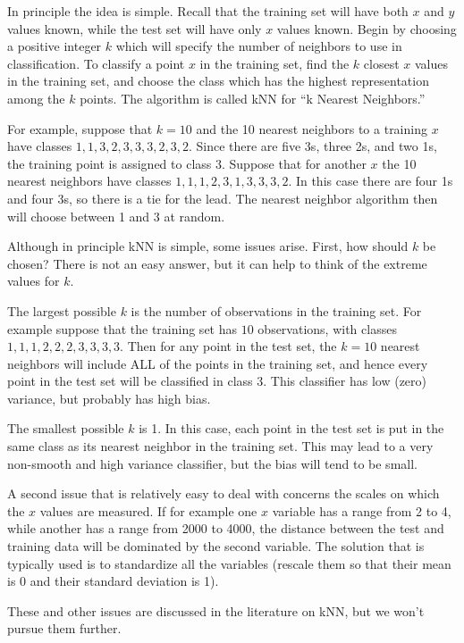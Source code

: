 \documentclass[12pt,oneside]{book}\usepackage[]{graphicx}\usepackage[]{color}
\begin{document}
{In principle the idea is simple. Recall that the training set will have both $x$ and $y$ values known, while the test set will have only $x$ values known. Begin by choosing a positive integer $k$ which will specify the number of neighbors to use in classification. To classify a point $x$ in the training set, find the $k$ closest $x$ values in the training set, and choose the class which has the highest representation among the $k$ points. The algorithm is called kNN for ``k Nearest Neighbors.'' 

For example, suppose that $k=10$ and the 10 nearest neighbors to a training $x$ have classes $1, 1, 3, 2, 3, 3, 3, 2, 3, 2$. Since there are five 3s, three 2s, and two 1s, the training point is assigned to class 3. Suppose that for another $x$ the 10 nearest neighbors have classes $1,1,1,2,3,1,3,3,3,2$. In this case there are four 1s and four 3s, so there is a tie for the lead. The nearest neighbor algorithm then will choose between 1 and 3 at random.

Although in principle kNN is simple, some issues arise. First, how should $k$ be chosen? There is not an easy answer, but it can help to think of the extreme values for $k$. 

The largest possible $k$ is the number of observations in the training set. For example suppose that the training set  has $10$ observations, with classes $1, 1, 1, 2, 2, 2, 3, 3, 3, 3$. Then for any point in the test set, the $k=10$ nearest neighbors will include ALL of the points in the training set, and hence every point in the test set will be classified in class 3. This classifier has low (zero) variance, but probably has high bias. 

The smallest possible $k$ is 1. In this case, each point in the test set is put in the same class as its nearest neighbor in the training set. This may lead to a very non-smooth and high variance classifier, but the bias will tend to be small. 

A second issue that is relatively easy to deal with concerns the scales on which the $x$ values are measured. If for example one $x$ variable has a range from 2 to 4, while another has a range from 2000 to 4000, the distance between the test and training data will be dominated by the second variable. The solution that is typically used is to standardize all the variables (rescale them so that their mean is 0 and their standard deviation is 1).

These and other issues are discussed in the literature on kNN, but we won't pursue them further.

}
\end{document}

